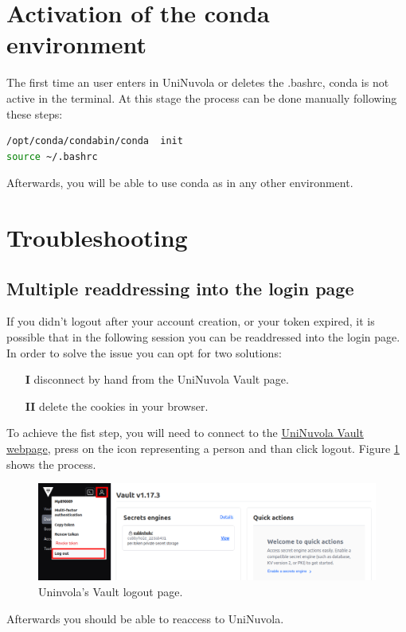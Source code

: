 \documentclass[a4paper,11pt]{article}
\begin{document}
\section{Activation of the conda environment}
The first time an user enters in UniNuvola or deletes the .bashrc, conda is not active in the terminal. At this stage the process can be done manually following these steps:
\begin{lstlisting}[language=bash] 
/opt/conda/condabin/conda  init
source ~/.bashrc
\end{lstlisting}
Afterwards, you will be able to use conda as in any other environment.

\section{Troubleshooting}
\subsection{Multiple readdressing into the login page}
If you didn't logout after your account creation, or your token expired, it is possible that in the following session you can be readdressed into the login page.  In order to solve the issue you can opt for two solutions:
\begin{itemize}
    \item[\textbf{I}] disconnect by hand from the UniNuvola Vault page.  
    \item[\textbf{II}] delete the cookies in your browser. 
\end{itemize}

To achieve the fist step, you will need to connect to the \href{https://vault.uninuvola.unipg.it:8200/ui/vault/dashboard}{UniNuvola Vault webpage}, press on the icon representing a person and than click logout. Figure \ref{img:logout} shows the process.      \\
\begin{figure}[!h]
    \center
    \includegraphics[width=0.8\linewidth]{vault.png}
    \caption{Uninvola's Vault logout page.}
    \label{img:logout}
\end{figure}

Afterwards you should be able to reaccess to UniNuvola.
\end{document}
